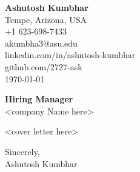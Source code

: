 \documentclass[11pt]{article}
\begin{document}
\begin{flushleft}
\textbf{Ashutosh Kumbhar} \\
Tempe, Arizona, USA \\
+1 623-698-7433 \\
akumbha3@asu.edu \\
linkedin.com/in/ashutosh-kumbhar \\
github.com/2727-ask \\
\today
\end{flushleft}

\vspace{0.5em}

\textbf{Hiring Manager} \\
<company Name here> \\

\vspace{1em}

<cover letter here>

Sincerely, \\
Ashutosh Kumbhar
\end{document}
